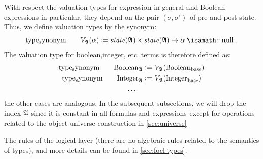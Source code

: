 With respect the valuation types for \OCL expression in general and Boolean expressions in
particular, they depend on the pair $(\sigma, \sigma')$ of pre-and post-state.  
Thus, we define valuation types by the synonym:
\begin{equation}
\typesynonym \qquad  \V{\isaAA}{\alpha} \defeq \state{\isaAA} \times \state{\isaAA} \to \alpha \ofType \TCnull \mi{.}
\end{equation}
The valuation type for boolean,integer, etc. \OCL terms is therefore defined as:
\begin{gather*}
\mathrm{type_synonym} \qquad \text{Boolean}_{\mathfrak{A}} \mathrel{\mathop:}=  V_{\mathfrak{A}}({\text{Boolean}_{\text{base}}}) \\
\mathrm{type_synonym} \qquad \text{Integer}_{\mathfrak{A}} \mathrel{\mathop:}=  V_{\mathfrak{A}}({\text{Integer}_{\text{base}}}) \\
\ldots \\
\end{gather*}
the other cases are analogous. In the subsequent subsections, we will drop the index $\mathfrak{A}$ since
it is constant in all formulas and expressions except for operations related to the object universe
construction in \autoref{sec:universe}

The rules of the logical layer (there are no algebraic rules related to the semantics of types),
and more details can be found in  \autoref{sec:focl-types}.

